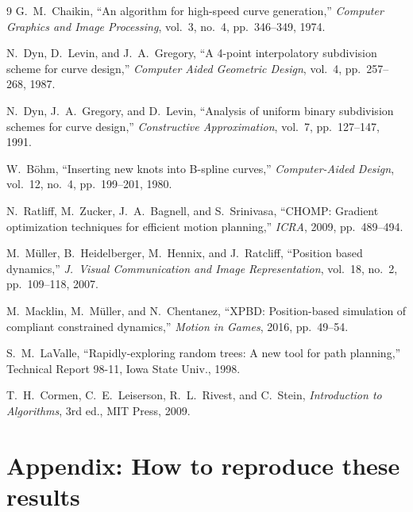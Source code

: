 \documentclass[10pt,a4paper,twocolumn]{article}
\begin{document}
\newpage
\begin{thebibliography}{9}\small
{}
G.~M.~Chaikin, ``An algorithm for high-speed curve generation,''
\emph{Computer Graphics and Image Processing}, vol.~3, no.~4,
pp.~346--349, 1974.

N.~Dyn, D.~Levin, and J.~A.~Gregory, ``A 4-point interpolatory
subdivision scheme for curve design,'' \emph{Computer Aided
Geometric Design}, vol.~4, pp.~257--268, 1987.

N.~Dyn, J.~A.~Gregory, and D.~Levin, ``Analysis of uniform binary
subdivision schemes for curve design,'' \emph{Constructive
Approximation}, vol.~7, pp.~127--147, 1991.

W.~B\"{o}hm, ``Inserting new knots into B-spline curves,''
\emph{Computer-Aided Design}, vol.~12, no.~4, pp.~199--201, 1980.

N.~Ratliff, M.~Zucker, J.~A.~Bagnell, and S.~Srinivasa,
``CHOMP: Gradient optimization techniques for efficient motion
planning,'' \emph{ICRA}, 2009, pp.~489--494.

M.~M\"{u}ller, B.~Heidelberger, M.~Hennix, and J.~Ratcliff,
``Position based dynamics,'' \emph{J.~Visual Communication and
Image Representation}, vol.~18, no.~2, pp.~109--118, 2007.

M.~Macklin, M.~M\"{u}ller, and N.~Chentanez, ``XPBD: Position-based
simulation of compliant constrained dynamics,'' \emph{Motion in
Games}, 2016, pp.~49--54.

S.~M.~LaValle, ``Rapidly-exploring random trees: A new tool for path
planning,'' Technical Report 98-11, Iowa State Univ., 1998.

T.~H.~Cormen, C.~E.~Leiserson, R.~L.~Rivest, and C.~Stein,
\emph{Introduction to Algorithms}, 3rd ed., MIT Press, 2009.

\end{thebibliography}

\appendix
\section*{Appendix: How to reproduce these results}
\end{document}
